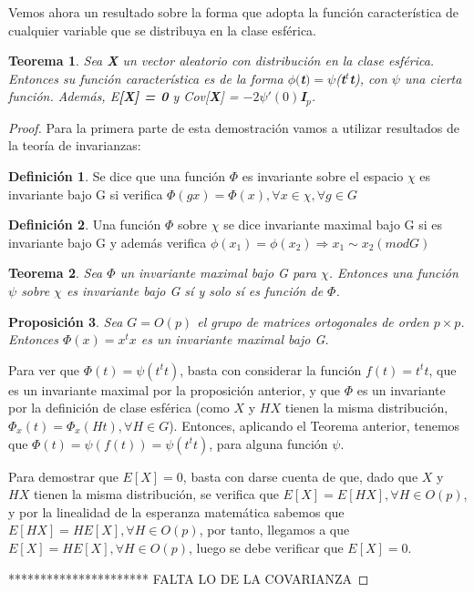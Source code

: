\documentclass{article}
\theoremstyle{theorem-style}  %
\newtheorem{theorem}{Teorema}[section]  %
\newtheorem{proposition}[theorem]{Proposición}
\theoremstyle{definition}
\newtheorem{definition}{Definición}[section]
\theoremstyle{example-style}
\begin{document}
	Vemos ahora un resultado sobre la forma que adopta la función característica de cualquier variable que se distribuya en la clase esférica.
	
	\begin{theorem}
		Sea \textbf{X} un vector aleatorio con distribución en la clase esférica. Entonces su función característica es de la forma $\phi($\textbf{t}$) = \psi$(\textbf{t}$^t$\textbf{t}), con $\psi$ una cierta función. Además, E\textbf{[X] = 0} y Cov[\textbf{X}]  = $-2\psi'(0)$\textbf{I}$_p$.
	\end{theorem}

	\begin{proof}
		
		Para la primera parte de esta demostración vamos a utilizar resultados de la teoría de invarianzas:
		
		\begin{definition}
			Se dice que una función $\Phi$ es invariante sobre el espacio $\chi$ es invariante bajo G si verifica $\Phi(gx) = \Phi(x), \forall x \in \chi, \forall g \in G$
		\end{definition}
	
		\begin{definition}
			Una función $\Phi$ sobre $\chi$ se dice invariante maximal bajo G si es invariante bajo G y además verifica $\phi(x_1) = \phi(x_2) \Rightarrow x_1 \sim x_2 (mod G)$
		\end{definition}
	
		\begin{theorem}
			Sea $\Phi$ un invariante maximal bajo G para $\chi$. Entonces una función $\psi$ sobre $\chi$ es invariante bajo G sí y solo sí es función de $\Phi$.
		\end{theorem}
	
	\begin{proposition}
		Sea $G = O(p)$ el grupo  de matrices ortogonales de orden $p \times p$. Entonces $\Phi(x) = x^tx$ es un invariante maximal bajo G.
	\end{proposition}

	Para ver que $\Phi(t) = \psi(t^tt)$, basta con considerar la función $f(t) = t^tt$, que es un invariante maximal por la proposición anterior, y que $\Phi$ es un invariante por la definición de clase esférica (como $X$ y $HX$ tienen la misma distribución, $\Phi_x(t) = \Phi_x(Ht), \forall H \in G$). Entonces, aplicando el Teorema anterior, tenemos que $\Phi(t) = \psi(f(t)) = \psi(t^tt)$, para alguna función $\psi$.
	
	Para demostrar que $E[X] = 0$, basta con darse cuenta de que, dado que $X$ y $HX$  tienen la misma distribución, se verifica que $E[X] = E[HX], \forall H \in O(p)$,  y por la linealidad de la esperanza matemática sabemos que $E[HX] = H E[X], \forall H \in O(p)$, por tanto, llegamos a que $E[X] = HE[X], \forall H \in O(p)$, luego se debe verificar que $E[X] = 0$.
	
	********************** FALTA LO DE LA COVARIANZA
	
	\end{proof}
\end{document}
